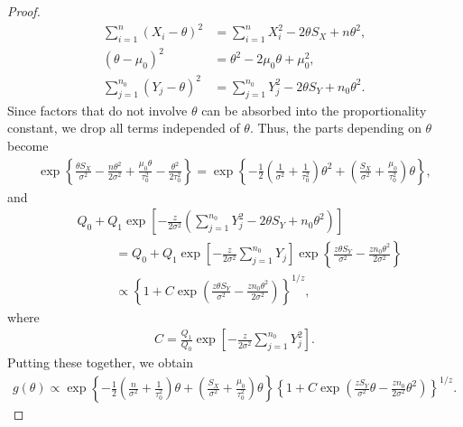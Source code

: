 \documentclass[12pt]{article}
\begin{document}
\begin{proof}
\begin{align*}
       \sum^n_{i=1}(X_i - \theta)^2 &= \sum^n_{i=1}X_i^2 - 2\theta S_X + n\theta^2, \\
       (\theta - \mu_0)^2 &= \theta^2 - 2\mu_0\theta + \mu_0^2, \\
       \sum^{n_0}_{j=1}(Y_j - \theta)^2 &= \sum^{n_0}_{j=1}Y_j^2 - 2\theta S_Y + n_0 \theta^2.
   \end{align*}
   Since factors that do not involve $\theta$ can be absorbed into the proportionality constant, we drop all terms independed of $\theta$.
   Thus, the parts depending on $\theta$ become
   \begin{align*}
       \exp\left\{\frac{\theta S_X}{\sigma^2} - \frac{n\theta^2}{2\sigma^2} + \frac{\mu_0\theta}{\tau_0^2} - \frac{\theta^2}{2\tau_0^2}\right\} = \exp\left\{-\frac{1}{2}\left(\frac{1}{\sigma^2} + \frac{1}{\tau_0^2}\right)\theta^2 + \left(\frac{S_X}{\sigma^2} + \frac{\mu_0}{\tau_0^2}\right)\theta \right\},
   \end{align*}
   and
   \begin{align*}
       &Q_0 + Q_1\exp\left[-\frac{z}{2\sigma^2}\left(\sum^{n_0}_{j=1}Y_j^2 - 2\theta S_Y + n_0\theta^2 \right)\right] \\
       &\quad\quad\quad = Q_0 + Q_1\exp\left[-\frac{z}{2\sigma^2}\sum^{n_0}_{j=1}Y_j\right]\exp\left\{\frac{z\theta S_Y}{\sigma^2} - \frac{zn_0\theta^2}{2\sigma^2}\right\} \\
       &\quad\quad\quad \propto \left\{1 + C\exp\left(\frac{z\theta S_Y}{\sigma^2} - \frac{z n_0\theta^2}{2\sigma^2}\right)\right\}^{1/z},
   \end{align*}
   where
   \begin{align*}
       C = \frac{Q_1}{Q_0}\exp\left[-\frac{z}{2\sigma^2}\sum^{n_0}_{j=1}Y_j^2\right].
   \end{align*}
   Putting these together, we obtain
   \begin{align*}
       g(\theta) \propto \exp\left\{-\frac{1}{2}\left(\frac{n}{\sigma^2} + \frac{1}{\tau_0^2}\right)\theta + \left(\frac{S_X}{\sigma^2} + \frac{\mu_0}{\tau_0^2}\right)\theta\right\}\left\{1 + C\exp\left(\frac{z S_Y}{\sigma^2}\theta - \frac{z n_0}{2\sigma^2}\theta^2\right)\right\}^{1/z}.
   \end{align*}
\end{proof}
\end{document}
